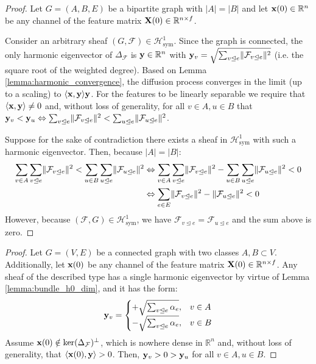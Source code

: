 \documentclass{article}
\def\vx{{\bf{x}}}
\def\vy{{\bf{y}}}
\def\mX{{\bf{X}}}
\def\gF{{\mathcal{F}}}
\def\gH{{\mathcal{H}}}
\def\sR{{\mathbb{R}}}
\newcommand{\tleq}{\trianglelefteq}
\DeclarePairedDelimiter{\norm}{\lVert}{\rVert}
\begin{document}
\HOneSymHeterophily*
\begin{proof}
Let $G = (A, B, E)$ be a bipartite graph with $\vert A \vert = \vert B \vert$ and let $\vx(0) \in \sR^n$ be any channel of the feature matrix $\mX(0) \in \sR^{n \times f}$. 

Consider an arbitrary sheaf $(G, \gF) \in \gH^1_\mathrm{sym}$. Since the graph is connected, the only harmonic eigenvector of $\Delta_\gF$ is $\vy \in \sR^n$ with $\vy_v = \sqrt{\sum_{v \tleq e} \norm{\gF_{v \tleq e}}^2}$ (i.e. the square root of the weighted degree). Based on Lemma \ref{lemma:harmonic_convergence}, the diffusion process converges in the limit (up to a scaling) to $\langle \vx,\vy \rangle \vy$. For the features to be linearly separable we require that $\langle \vx,\vy \rangle \neq 0$ and, without loss of generality, for all $v \in A, u \in B$ that $\vy_v < \vy_u \Leftrightarrow \sum_{v \tleq e} \norm{\gF_{v \tleq e}}^2 < \sum_{u \tleq e} \norm{\gF_{u \tleq e}}^2$. 

Suppose for the sake of contradiction there exists a sheaf in $\gH^1_\mathrm{sym}$ with such a harmonic eigenvector. Then, because $|A| = |B|$: 
\begin{align}
    \sum_{v \in A} \sum_{v \tleq e} \norm{\gF_{v \tleq e}}^2 < \sum_{u \in B} \sum_{u \tleq e} \norm{\gF_{u \tleq e}}^2 &\Leftrightarrow
     \sum_{v \in A} \sum_{v \tleq e} \norm{\gF_{v \tleq e}}^2 - \sum_{u \in B} \sum_{u \tleq e} \norm{\gF_{u \tleq e}}^2 < 0  \nonumber \\
    &\Leftrightarrow
    \sum_{e \in E} \norm{\gF_{v \tleq e}}^2 - \norm{\gF_{u \tleq e}}^2 < 0 \nonumber
\end{align}
However, because $(\gF, G) \in \gH^1_\mathrm{sym}$, we have $\gF_{v \tleq e} = \gF_{u \tleq e}$ and the sum above is zero. 
\end{proof}


\HOneLinearSeparation*
\begin{proof}
Let $G = (V, E)$ be a connected graph with two classes $A, B \subset V$. Additionally, let $\vx(0)$ be any channel of the feature matrix $\mX(0) \in \sR^{n \times f}$. Any sheaf of the  described type has a single harmonic eigenvector by virtue of Lemma \ref{lemma:bundle_h0_dim}, and it has the form:
\begin{align}
    \vy_v = 
    \begin{cases}
        + \sqrt{\sum_{v \tleq e} \alpha_e}, & v \in A \\
        - \sqrt{\sum_{v \tleq e} \alpha_e}, & v \in B
    \end{cases}
\end{align}
Assume $\vx(0) \notin \mathrm{ker}(\Delta_\gF)^\perp$, which is nowhere dense in $\sR^n$ and, without loss of generality, that $\langle \vx(0),\vy \rangle > 0$. Then, $\vy_v > 0 > \vy_u$ for all $v \in A, u \in B$.  
\end{proof}
\end{document}
